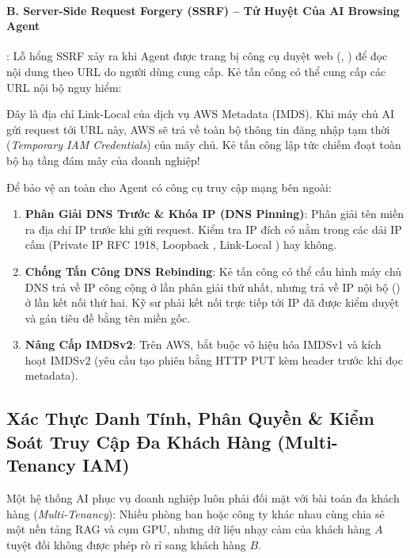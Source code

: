 \paragraph{B. Server-Side Request Forgery (SSRF) -- Tử Huyệt Của AI Browsing Agent}:
Lỗ hổng SSRF xảy ra khi Agent được trang bị công cụ duyệt web (, ) để đọc nội dung theo URL do người dùng cung cấp. Kẻ tấn công có thể cung cấp các URL nội bộ nguy hiểm:
\begin{center}
\end{center}
Đây là địa chỉ Link-Local của dịch vụ AWS Metadata (IMDS). Khi máy chủ AI gửi request tới URL này, AWS sẽ trả về toàn bộ thông tin đăng nhập tạm thời (\textit{Temporary IAM Credentials}) của máy chủ. Kẻ tấn công lập tức chiếm đoạt toàn bộ hạ tầng đám mây của doanh nghiệp!

\begin{securitybox}
Để bảo vệ an toàn cho Agent có công cụ truy cập mạng bên ngoài:
\begin{enumerate}
  \item \textbf{Phân Giải DNS Trước \& Khóa IP (DNS Pinning)}: Phân giải tên miền ra địa chỉ IP trước khi gửi request. Kiểm tra IP đích có nằm trong các dải IP cấm (Private IP RFC 1918, Loopback , Link-Local ) hay không.
  \item \textbf{Chống Tấn Công DNS Rebinding}: Kẻ tấn công có thể cấu hình máy chủ DNS trả về IP công cộng ở lần phân giải thứ nhất, nhưng trả về IP nội bộ () ở lần kết nối thứ hai. Kỹ sư phải kết nối trực tiếp tới IP đã được kiểm duyệt và gán tiêu đề  bằng tên miền gốc.
  \item \textbf{Nâng Cấp IMDSv2}: Trên AWS, bắt buộc vô hiệu hóa IMDSv1 và kích hoạt IMDSv2 (yêu cầu tạo phiên bằng HTTP PUT kèm header  trước khi đọc metadata).
\end{enumerate}
\end{securitybox}

\subsection{Xác Thực Danh Tính, Phân Quyền \& Kiểm Soát Truy Cập Đa Khách Hàng (Multi-Tenancy IAM)}
\label{subsec:multi-tenancy-iam}
Một hệ thống AI phục vụ doanh nghiệp luôn phải đối mặt với bài toán đa khách hàng (\textit{Multi-Tenancy}): Nhiều phòng ban hoặc công ty khác nhau cùng chia sẻ một nền tảng RAG và cụm GPU, nhưng dữ liệu nhạy cảm của khách hàng $A$ tuyệt đối không được phép rò rỉ sang khách hàng $B$.

